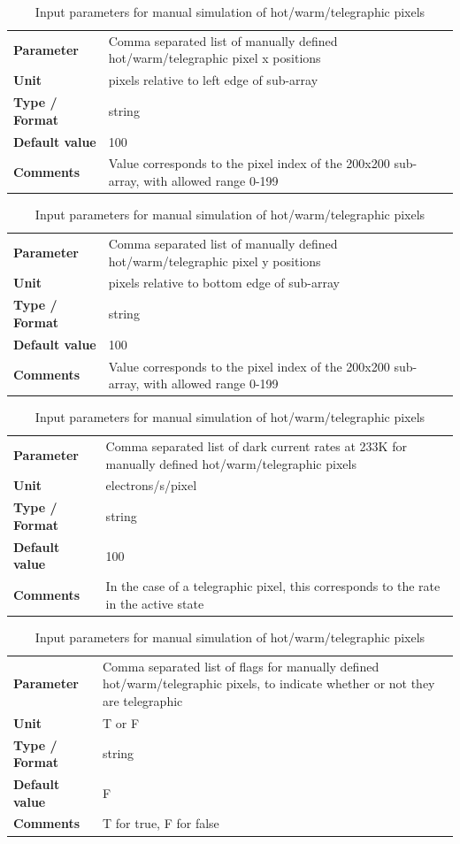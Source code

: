 \documentclass[11pt]{article}      %
\def\HCode#1{}
\def\htmlanchor#1{\HCode{<a id="#1"></a>}}
\begin{document}
\begin{table}[hb]
  \caption{Input parameters for manual simulation of hot/warm/telegraphic pixels}

  \htmlanchor{manualHotPixelX}
  \begin{tabular}{| l | p{13cm} |}
    \hline 
    {\bf Parameter} & Comma separated list of manually defined hot/warm/telegraphic pixel x positions\\
    {\bf Unit} & pixels relative to left edge of sub-array\\
    {\bf Type / Format} & string\\
    {\bf Default value} & 100\\
    {\bf Comments} & Value corresponds to the pixel index of the 200x200 sub-array, with allowed range 0-199\\
    \hline
  \end{tabular}
  \bigskip

  \htmlanchor{manualHotPixelY}
  \begin{tabular}{| l | p{13cm} |}
    \hline 
    {\bf Parameter} & Comma separated list of manually defined hot/warm/telegraphic pixel y positions\\
    {\bf Unit} & pixels relative to bottom edge of sub-array\\
    {\bf Type / Format} & string\\
    {\bf Default value} & 100\\
    {\bf Comments} & Value corresponds to the pixel index of the 200x200 sub-array, with allowed range 0-199\\
    \hline
  \end{tabular}
  \bigskip

  \htmlanchor{manualHotPixelRate}
  \begin{tabular}{| l | p{13cm} |}
    \hline 
    {\bf Parameter} & Comma separated list of dark current rates at 233K for manually defined hot/warm/telegraphic pixels\\
    {\bf Unit} & electrons/s/pixel\\
    {\bf Type / Format} & string\\
    {\bf Default value} & 100\\
    {\bf Comments} & In the case of a telegraphic pixel, this corresponds to the rate in the active state\\
    \hline
  \end{tabular}
  \bigskip

  \htmlanchor{manualHotPixelIsTelegraphic}
  \begin{tabular}{| l | p{13cm} |}
    \hline 
    {\bf Parameter} & Comma separated list of flags for manually defined hot/warm/telegraphic pixels, to indicate whether or not they are telegraphic\\
    {\bf Unit} & T or F\\
    {\bf Type / Format} & string\\
    {\bf Default value} & F\\
    {\bf Comments} & T for true, F for false\\
    \hline
  \end{tabular}
  \bigskip

  \label{tab:manualHotPixels}
\end{table}
\end{document}
